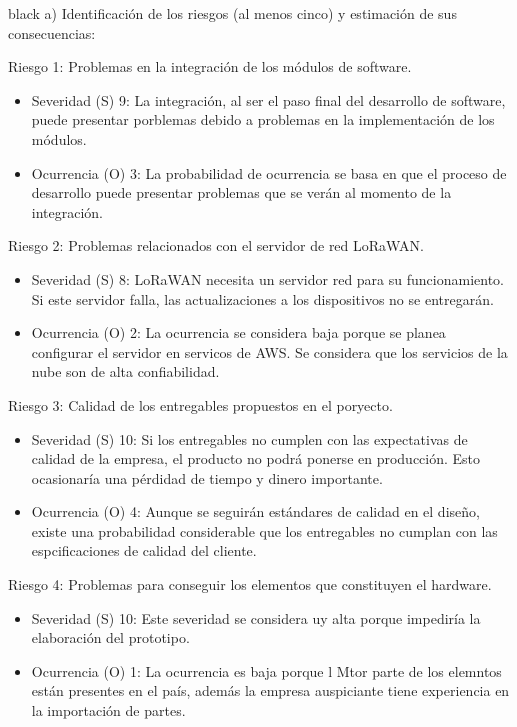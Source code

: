 \documentclass[11pt]{charter}
\begin{document}
\begin{consigna}{black}
a) Identificación de los riesgos (al menos cinco) y estimación de sus consecuencias:
 
Riesgo 1: Problemas en la integración de los módulos de software.
\begin{itemize}
	\item Severidad (S) 9: La integración, al ser el paso final del desarrollo de software, puede presentar porblemas debido a problemas en la implementación de los módulos.
	\item Ocurrencia (O) 3: La probabilidad de ocurrencia se basa en que el proceso de desarrollo puede presentar problemas que se verán al momento de la integración.
\end{itemize}

Riesgo 2: Problemas relacionados con el servidor de red LoRaWAN.
\begin{itemize}
	\item Severidad (S) 8: LoRaWAN necesita un servidor red para su funcionamiento. Si este servidor falla, las actualizaciones a los dispositivos no se entregarán.
	\item Ocurrencia (O) 2: La ocurrencia se considera baja porque se planea configurar el servidor en servicos de AWS. Se considera que los servicios de la nube son de alta confiabilidad.
\end{itemize}

Riesgo 3: Calidad de los entregables propuestos en el poryecto.
\begin{itemize}
	\item Severidad (S) 10: Si los entregables no cumplen con las expectativas de calidad de la empresa, el producto no podrá ponerse en producción. Esto ocasionaría una pérdidad de tiempo y dinero importante.
	\item Ocurrencia (O) 4: Aunque se seguirán estándares de calidad en el diseño, existe una probabilidad considerable que los entregables no cumplan con las espcificaciones de calidad del cliente.
\end{itemize}

Riesgo 4: Problemas para conseguir los elementos que constituyen el hardware.
\begin{itemize}
	\item Severidad (S) 10: Este severidad se considera uy alta porque impediría la elaboración del prototipo.
	\item Ocurrencia (O) 1: La ocurrencia es baja porque l Mtor parte de los elemntos están presentes en el país, además la empresa auspiciante tiene experiencia en la importación de partes.
\end{itemize}


\end{consigna}
\end{document}
